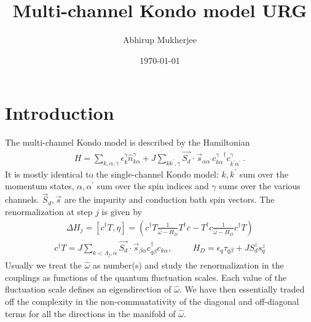 \documentclass{revtex4-2}
\begin{document}
\title{Multi-channel Kondo model URG}
\author{Abhirup Mukherjee}
\date{\today}
\maketitle
\section{Introduction}
The multi-channel Kondo model is described by the Hamiltonian
\begin{equation}\begin{aligned}
	H = \sum_{k,\alpha,\gamma}\epsilon_{k}^\gamma \hat n^\gamma_{k\alpha} + J\sum_{kk^\prime,\gamma} \vec{S_d}\cdot\vec{s}_{\alpha\alpha^\prime}{c^\gamma_{k\alpha}}^\dagger c^\gamma_{k^\prime\alpha^\prime}~.
\end{aligned}\end{equation}
It is mostly identical to the single-channel Kondo model: \(k,k^\prime\) sum over the momentum states, \(\alpha,\alpha^\prime\) sum over the spin indices and \(\gamma\) sums over the various channels. \(\vec S_d, \vec s\) are the impurity and conduction bath spin vectors. The renormalization at step \(j\) is given by
\begin{equation}\begin{aligned}
	\Delta H_j = \left[c^\dagger T, \eta \right] = \left(c^\dagger T \frac{1}{\hat \omega - H_D}T^\dagger c - T^\dagger c \frac{1}{\hat \omega - H_D}c^\dagger T\right)
\end{aligned}\end{equation}
\begin{equation}\begin{aligned}
	c^\dagger T = J \sum_{k < \Lambda_j, \alpha}\vec{S_d}\cdot\vec{s}_{\beta \alpha}c^\dagger_{q\beta}c_{k\alpha}, &&&H_D = \epsilon_q \tau_{q\beta} + J S_d^z s_q^z
\end{aligned}\end{equation}
Usually we treat the \(\hat \omega\) as number(s) and study the renormalization in the couplings as functions of the quantum fluctuation scales. Each value of the fluctuation scale defines an eigendirection of \(\hat \omega\). We have then essentially traded off the complexity in the non-commuatativity of the diagonal and off-diagonal terms for all the directions in the manifold of \(\hat \omega\).
\end{document}
